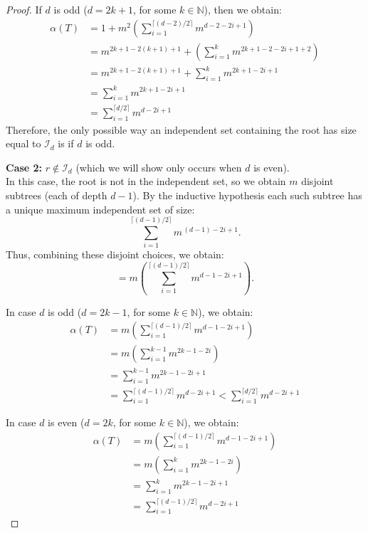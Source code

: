 \documentclass{amsart}
\theoremstyle{definition}
\newcommand\II{{\mathcal I}}
\begin{document}
\begin{proof}
	If $d$ is odd ($d = 2k + 1$, for some $k \in \mathbb{N}$), then we obtain:
	\begin{align*}
		\alpha(T) & = 1 + m^2\left(\sum_{i=1}^{\lceil (d-2)/2 \rceil} m^{d - 2 -2i+1}\right)                \\
		          & = m^{2k + 1 - 2(k + 1) + 1} + \left(\sum_{i = 1}^{k} m^{2k + 1 - 2 - 2i + 1 + 2}\right) \\
		          & = m^{2k + 1 - 2(k + 1) + 1} + \sum_{i = 1}^{k} m^{2k + 1 - 2i + 1}                      \\
		          & = \sum_{i = 1}^{k} m^{2k + 1 - 2i + 1}                                                  \\
		          & = \sum_{i = 1}^{\lceil d/2 \rceil}m^{d-2i+1}
	\end{align*}
	Therefore, the only possible way an independent set containing the root has size equal to $\II_d$ is if $d$ is odd.

	\medskip

	\textbf{Case 2:} $r\notin \mathcal{I}_{d}$ (which we will show only occurs when $d$ is even).\\[1mm]
	In this case, the root is not in the independent set, so we obtain $m$ disjoint subtrees (each of depth $d-1$). By the inductive hypothesis each such subtree has a unique maximum independent set of size:
	\[
		\sum_{i=1}^{\lceil (d-1)/2 \rceil} m^{\, (d-1)-2i+1}.
	\]
	Thus, combining these disjoint choices, we obtain:
	\[
		= m\left(\sum_{i=1}^{\lceil (d-1)/2 \rceil} m^{d-1-2i+1}\right).
	\]

	In case $d$ is odd ($d = 2k - 1$, for some $k \in \mathbb{N}$), we obtain:
	\begin{align*}
		\alpha(T) & = m\left(\sum_{i=1}^{\lceil (d-1)/2 \rceil} m^{d - 1 -2i+1}\right) \\
		          & = m\left(\sum_{i=1}^{k - 1} m^{2k - 1 - 2i}\right)                 \\
		          & = \sum_{i=1}^{k - 1} m^{2k - 1 - 2i + 1}                           \\
		          & = \sum_{i = 1}^{\lceil (d - 1)/ 2\rceil}m^{d-2i+1}
		< \sum_{i = 1}^{\lceil d/2 \rceil}m^{d - 2i + 1}
	\end{align*}

	In case $d$ is even ($d = 2k$, for some $k \in \mathbb{N}$), we obtain:
	\begin{align*}
		\alpha(T) & = m\left(\sum_{i=1}^{\lceil (d-1)/2 \rceil} m^{d - 1 -2i+1}\right) \\
		          & = m\left(\sum_{i=1}^{k} m^{2k - 1 - 2i}\right)                     \\
		          & = \sum_{i=1}^{k} m^{2k - 1 - 2i + 1}                               \\
		          & = \sum_{i = 1}^{\lceil (d - 1)/ 2\rceil}m^{d-2i+1}
	\end{align*}


\end{proof}
\end{document}
